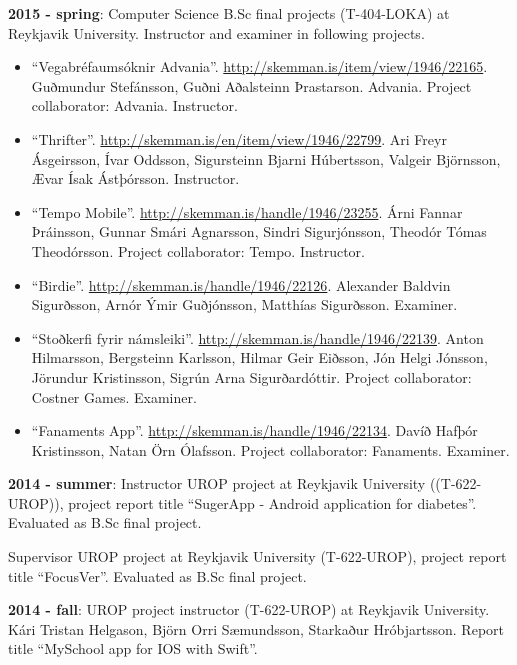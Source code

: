 \textbf{2015 - spring}: Computer Science B.Sc final projects (T-404-LOKA) at Reykjavik University. Instructor and examiner in following projects.

\begin{itemize}
\item ``Vegabréfaumsóknir Advania''.
    \url{http://skemman.is/item/view/1946/22165}. Guðmundur Stefánsson, Guðni
        Aðalsteinn Þrastarson. Advania. Project collaborator: Advania.
        Instructor.

\item ``Thrifter''. \url {http://skemman.is/en/item/view/1946/22799}. Ari Freyr
    Ásgeirsson, Ívar Oddsson, Sigursteinn Bjarni Húbertsson, Valgeir Björnsson,
        Ævar Ísak Ástþórsson. Instructor.

\item ``Tempo Mobile''. \url{http://skemman.is/handle/1946/23255}. Árni Fannar
    Þráinsson, Gunnar Smári Agnarsson, Sindri Sigurjónsson, Theodór Tómas
        Theodórsson. Project collaborator: Tempo. Instructor.

\item ``Birdie''. \url{http://skemman.is/handle/1946/22126}. Alexander Baldvin
    Sigurðsson, Arnór Ýmir Guðjónsson, Matthías Sigurðsson. Examiner.

\item ``Stoðkerfi fyrir námsleiki''. \url{http://skemman.is/handle/1946/22139}.
    Anton Hilmarsson, Bergsteinn Karlsson, Hilmar Geir Eiðsson, Jón Helgi
        Jónsson, Jörundur Kristinsson, Sigrún Arna Sigurðardóttir. Project
        collaborator: Costner Games. Examiner.

\item ``Fanaments App''. \url{http://skemman.is/handle/1946/22134}. Davíð
    Hafþór Kristinsson, Natan Örn Ólafsson. Project collaborator: Fanaments.
        Examiner.
\end{itemize}

\textbf{2014 - summer}:
Instructor UROP project at Reykjavik University ((T-622-UROP)), project report
title ``SugerApp - Android application for diabetes''. Evaluated as B.Sc final
project.

Supervisor UROP project at Reykjavik University (T-622-UROP), project report
title ``FocusVer''. Evaluated as B.Sc final project.

\textbf{2014 - fall}: UROP project instructor (T-622-UROP) at Reykjavik
University. Kári Tristan Helgason, Björn Orri Sæmundsson, Starkaður
Hróbjartsson. Report title ``MySchool app for IOS with Swift''.

